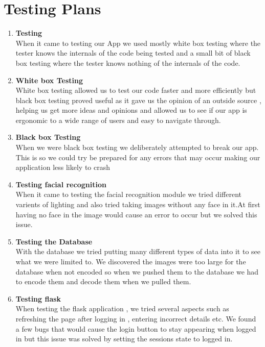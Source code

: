 \documentclass{article}
\begin{document}
\newpage

\section{Testing Plans}

\begin{enumerate}
\item \textbf{Testing} \\
When it came to testing  our App we used mostly white box testing where the tester knows the internals of the code being tested and a small bit of black box testing where the tester knows nothing of the internals of the code.
\item \textbf{White box Testing} \\
White box testing allowed us to test our code faster and more efficiently but black box testing proved useful as it gave us the opinion of an outside source  , helping us get more ideas and opinions and allowed us to see if our app is ergonomic to a wide range of users and easy to navigate through.
\item \textbf{Black box Testing} \\
When we were black box testing we deliberately attempted to break our app. This is so we could try be prepared for any errors that may occur making our application less likely to crash
\item \textbf{Testing facial recognition} \\
When it came to testing the facial recognition module we tried different varients of lighting and also tried taking images without any face in it.At first having no face in the image would cause an error to occur but we solved this issue.
\item \textbf{Testing the Database} \\
With the database we tried putting many different types of data into it to see what we were limited to. We discovered the images were too large for the database when not encoded so when we pushed them to the database we had to encode them and decode them when we pulled them.
\item \textbf{Testing flask} \\
When testing the flask application , we tried several aspects such as refreshing the page after logging in , entering incorrect details etc. We found a few bugs that would cause the login button to stay appearing when logged in but this issue was solved by setting the sessions state to logged in.
\end{enumerate}
\newpage
\end{document}
